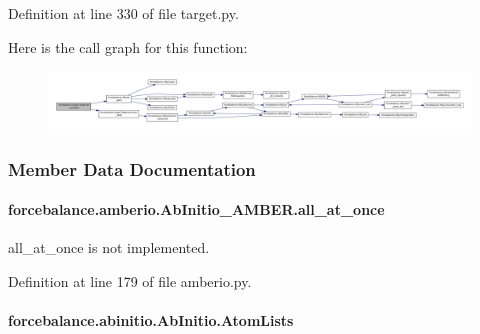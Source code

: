 Definition at line 330 of file target.\-py.



Here is the call graph for this function\-:\nopagebreak
\begin{figure}[H]
\begin{center}
\leavevmode
\includegraphics[width=350pt]{classforcebalance_1_1target_1_1Target_af6099ec09486213869dba2491bd8ea04_cgraph}
\end{center}
\end{figure}




\subsubsection{Member Data Documentation}
\hypertarget{classforcebalance_1_1amberio_1_1AbInitio__AMBER_a39462b1942be0f7fb6202862ad1afa9c}{
\paragraph[{all\-\_\-at\-\_\-once}]{\setlength{\rightskip}{0pt plus 5cm}forcebalance.\-amberio.\-Ab\-Initio\-\_\-\-A\-M\-B\-E\-R.\-all\-\_\-at\-\_\-once}}\label{classforcebalance_1_1amberio_1_1AbInitio__AMBER_a39462b1942be0f7fb6202862ad1afa9c}


all\-\_\-at\-\_\-once is not implemented. 



Definition at line 179 of file amberio.\-py.

\hypertarget{classforcebalance_1_1abinitio_1_1AbInitio_a7e62a74e820ac0c5dd67f49155b95c41}{
\paragraph[{Atom\-Lists}]{\setlength{\rightskip}{0pt plus 5cm}forcebalance.\-abinitio.\-Ab\-Initio.\-Atom\-Lists\hspace{0.3cm}{\ttfamily [inherited]}}}\label{classforcebalance_1_1abinitio_1_1AbInitio_a7e62a74e820ac0c5dd67f49155b95c41}


